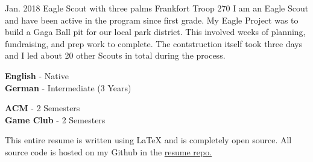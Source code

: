\documentclass[9pt]{developercv} %
\begin{document}

\begin{entrylist}
	\entry
		{Jan. 2018}
		{Eagle Scout with three palms}
		{Frankfort Troop 270}
		{I am an Eagle Scout and have been active in the program since first grade. My Eagle Project was to build a Gaga Ball pit for our local park district. This involved weeks of planning, fundraising, and prep work to complete. The contstruction itself took three days and I led about 20 other Scouts in total during the process.}
\end{entrylist}

\begin{minipage}[t]{0.3\textwidth}
	\vspace{-\baselineskip} %

	
	\textbf{English} - Native\\
	\textbf{German} - Intermediate (3 Years)\\
\end{minipage}
\hfill
\begin{minipage}[t]{0.25\textwidth}
	\vspace{-\baselineskip} %
	
	
	\textbf{ACM} - 2 Semesters\\
	\textbf{Game Club} - 2 Semesters\\
\end{minipage}
\hfill
\begin{minipage}[t]{0.4\textwidth}
	\vspace{-\baselineskip} %
	
	
	This entire resume is written using LaTeX and is completely open source. All source code is hosted on my Github in the \href{https://www.github.com/Dizeeee/resume}{resume repo.}
\end{minipage}

\end{document}
